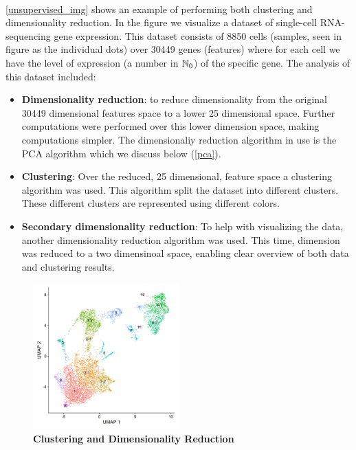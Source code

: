 ~\\\autoref{unsupervised_img} shows an example of performing both clustering and dimensionality reduction. In the figure we visualize a dataset of single-cell RNA-sequencing gene expression. This dataset consists of 8850 cells (samples, seen in figure as the individual dots) over 30449 genes (features) where for each cell we have the level of expression (a number in $\mathbb{N}_0$) of the specific gene. The analysis of this dataset included:
\begin{itemize}
	\item \textbf{Dimensionality reduction}: to reduce dimensionality from the original 30449 dimensional features space to a lower 25 dimensional space. Further computations were performed over this lower dimension space, making computations simpler. The dimensionaliy reduction algorithm in use is the PCA algorithm which we discuss below (\autoref{pca}).\\
	\item \textbf{Clustering}: Over the reduced, 25 dimensional, feature space a clustering algorithm was used. This algorithm split the dataset into different clusters. These  different clusters are represented using different colors.\\
	\item \textbf{Secondary dimensionality reduction}: To help with visualizing the data, another dimensionality reduction algorithm was used. This time, dimension was reduced to a two dimensinoal space, enabling clear overview of both data and clustering results.
\end{itemize}

\begin{figure}[h!]
	\centering
	\includegraphics[width=0.5\textwidth]{chapters/unsupervised.learning/figures/single.cell.dim.clust.png}
	\caption{\textbf{Clustering and Dimensionality Reduction}}\label{unsupervised_img}
\end{figure}

